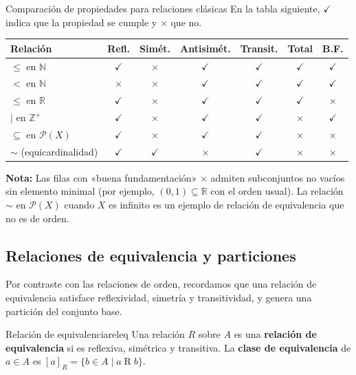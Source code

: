 \begin{ejemplo}{Comparación de propiedades para relaciones clásicas}{}
En la tabla siguiente, $\checkmark$ indica que la propiedad se cumple y $\times$ que no.
\begin{center}
\renewcommand{\arraystretch}{1.3}
\begin{tabular}{lcccccc}
\hline
\textbf{Relación} & \textbf{Refl.} & \textbf{Simét.} & \textbf{Antisimét.} & \textbf{Transit.} & \textbf{Total} & \textbf{B.F.} \\
\hline
$\leq$ en $\mathbb{N}$              & $\checkmark$ & $\times$ & $\checkmark$ & $\checkmark$ & $\checkmark$ & $\checkmark$ \\
$<$ en $\mathbb{N}$                 & $\times$     & $\times$ & $\checkmark$ & $\checkmark$ & $\checkmark$ & $\checkmark$ \\
$\leq$ en $\mathbb{R}$              & $\checkmark$ & $\times$ & $\checkmark$ & $\checkmark$ & $\checkmark$ & $\times$ \\
$|$ en $\mathbb{Z}^+$               & $\checkmark$ & $\times$ & $\checkmark$ & $\checkmark$ & $\times$     & $\checkmark$ \\
$\subseteq$ en $\mathcal{P}(X)$     & $\checkmark$ & $\times$ & $\checkmark$ & $\checkmark$ & $\times$     & $\times$ \\
$\sim$ (equicardinalidad)           & $\checkmark$ & $\checkmark$ & $\times$  & $\checkmark$ & $\times$     & $\times$ \\
\hline
\end{tabular}
\end{center}
\textbf{Nota:} Las filas con «buena fundamentación» $\times$ admiten subconjuntos no vacíos sin elemento minimal (por ejemplo, $(0,1) \subseteq \mathbb{R}$ con el orden usual). La relación $\sim$ en $\mathcal{P}(X)$ cuando $X$ es infinito es un ejemplo de relación de equivalencia que no es de orden.
\end{ejemplo}

\subsection{Relaciones de equivalencia y particiones}

Por contraste con las relaciones de orden, recordamos que una relación de equivalencia satisface reflexividad, simetría y transitividad, y genera una partición del conjunto base.

\begin{definicion}{Relación de equivalencia}{releq}
Una relación $R$ sobre $A$ es una \textbf{relación de equivalencia} si es reflexiva, simétrica y transitiva. La \textbf{clase de equivalencia} de $a \in A$ es $[a]_R = \{b \in A \mid a \mathrel{R} b\}$.
\end{definicion}

